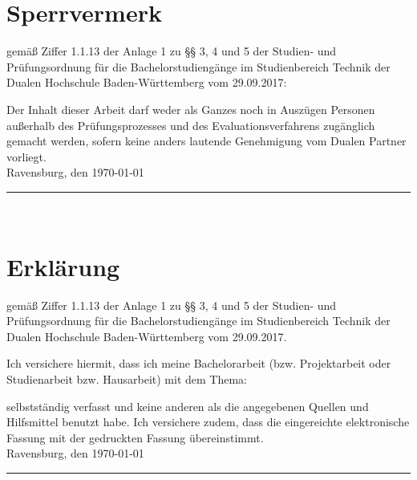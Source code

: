 
\chapter*{Sperrvermerk} 
gemäß Ziffer 1.1.13 der Anlage 1 zu §§ 3, 4 und 5  der Studien- und Prüfungsordnung für die Bachelorstudiengänge im Studienbereich Technik der Dualen 
Hochschule Baden-Württemberg vom 29.09.2017:

Der Inhalt dieser Arbeit darf weder als Ganzes noch in Auszügen Personen außerhalb des Prüfungsprozesses und des Evaluationsverfahrens zugänglich gemacht 
werden, sofern keine anders lautende Genehmigung vom Dualen Partner vorliegt.\\[6ex]

Ravensburg, den \today \\[4ex]

\rule[-0.2cm]{5cm}{0.5pt}

\autor \\[10ex]

\thispagestyle{empty}

\chapter*{Erklärung} 

gemäß Ziffer 1.1.13 der Anlage 1 zu §§ 3, 4 und 5  der Studien- und Prüfungsordnung für die Bachelorstudiengänge im Studienbereich Technik der Dualen 
Hochschule Baden-Württemberg vom 29.09.2017.

Ich versichere hiermit, dass ich meine Bachelorarbeit (bzw. Projektarbeit oder Studienarbeit bzw. Hausarbeit) mit dem Thema:

\begin{quote}
	\textit{\titel} %
\end{quote}

selbstständig verfasst und keine anderen als die angegebenen Quellen und Hilfsmittel benutzt habe. Ich versichere zudem, dass die eingereichte elektronische 
Fassung mit der gedruckten Fassung übereinstimmt.\\[6ex]

Ravensburg, den \today \\[1ex]

\rule[-0.2cm]{5cm}{0.5pt}

\autor \\[10ex]

\rmfamily

\thispagestyle{empty}

